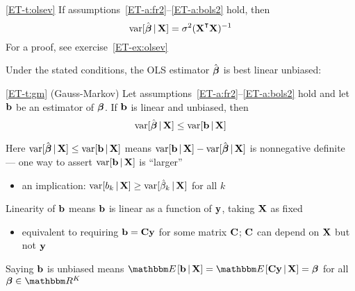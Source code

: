 \begin{frame}

    \vspace{2em}
    \Thm
    \eqref{ET-t:olsev}
    If assumptions~\ref{ET-a:fr2}--\ref{ET-a:bols2} hold, then
    \begin{equation}
        \label{eq:vhbb}
        \var [\hboldbeta \given \boldX ] = \sigma^2 (\boldX^\T \boldX)^{-1}
    \end{equation}
    For a proof, see exercise~\ref{ET-ex:olsev}
    
    Under the stated conditions, the OLS
    estimator $\hat {\boldsymbol \beta}$ is best linear unbiased:

    \vspace{.7em}
    \Thm
    \eqref{ET-t:gm} (Gauss-Markov)
        Let assumptions~\ref{ET-a:fr2}--\ref{ET-a:bols2} hold and let ${\mathbf b}$ be an
        estimator of ${\boldsymbol \beta}$.  If ${\mathbf b}$ is linear and unbiased, then
        \begin{equation*}
             \operatorname{var} [\hat {\boldsymbol \beta} \, | \, \mathbf X] \leq \operatorname{var} [{\mathbf b} \, | \, \mathbf X]
        \end{equation*}
        
\end{frame}

\begin{frame}
  
    \vspace{2em}
    Here $\operatorname{var} [\hat {\boldsymbol \beta} \, | \, \mathbf X] \leq \operatorname{var} [{\mathbf b} \, | \,
    \mathbf X]$ means  $\operatorname{var} [{\mathbf b} \, | \, \mathbf X] - \operatorname{var}
    [\hat {\boldsymbol \beta} \, | \, \mathbf X]$ is nonnegative definite --- one 
    way to assert $\operatorname{var} [{\mathbf b} \, | \, \mathbf X]$ is ``larger''
    
    \begin{itemize}
        \item an implication: $\operatorname{var} [b_k \, | \, \mathbf X] \geq \operatorname{var} [\hat \beta_k \, | \, \mathbf X]$ for all $k$
    \end{itemize}
    
    \vspace{.7em}
    Linearity of ${\mathbf b}$ means  ${\mathbf b}$ is linear as a function of
    ${\mathbf y}$, taking $\mathbf X$ as fixed
    \begin{itemize}
        \item equivalent to requiring 
            ${\mathbf b} = \mathbf C {\mathbf y}$ for some matrix $\mathbf C$; $\mathbf C$ 
            can depend on $\mathbf X$ but not ${\mathbf y}$
    \end{itemize}
    
    \vspace{.7em}
    Saying ${\mathbf b}$ is unbiased means  $\EE [\boldb \given \boldX] = \EE [ \boldC \boldy \given \boldX] =
    \boldbeta$ for all $\boldbeta \in \RR^K$
    
\end{frame}

